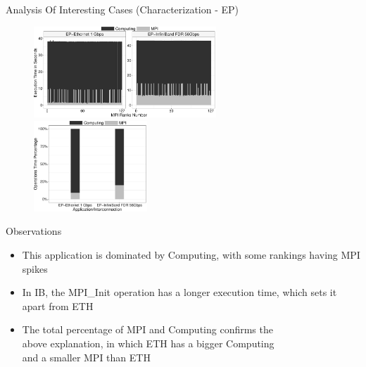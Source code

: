 \documentclass{beamer}
\begin{document}
\begin{frame}{Analysis Of Interesting Cases (Characterization - EP)}
\begin{figure}
   \includegraphics[width=0.61\textwidth]{SLIDES/img/EP.charac.pdf}
   \includegraphics[width=0.38\textwidth]{SLIDES/img/EP.percentage.pdf}
\end{figure}
\pause Observations
\begin{itemize}
    \item This application is \alert{dominated by Computing}, with some rankings having \alert{MPI spikes}
    \pause\item In IB, the MPI\_Init operation has a \alert{longer execution time}, which sets it apart from ETH
    \pause\item The total percentage of MPI and Computing confirms the \\above explanation, in which \alert{ETH has a bigger Computing} \\and a \alert{smaller MPI than ETH}   
\end{itemize}

\end{frame}
\end{document}
